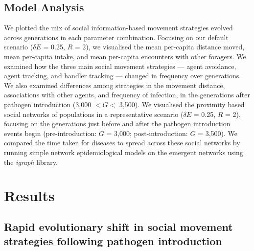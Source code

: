 \subsection*{Model Analysis}

We plotted the mix of social information-based movement strategies evolved across generations in each parameter combination.
Focusing on our default scenario ($\delta E$ = 0.25, $R$ = 2), we visualised the mean per-capita distance moved, mean per-capita intake, and mean per-capita encounters with other foragers.
We examined how the three main social movement strategies --- agent avoidance, agent tracking, and handler tracking --- changed in frequency over generations.
We also examined differences among strategies in the movement distance, associations with other agents, and frequency of infection, in the generations after pathogen introduction (3,000 $< G <$ 3,500).
We visualised the proximity based social networks of populations in a representative scenario ($\delta E$ = 0.25, $R$ = 2), focusing on the generations just before and after the pathogen introduction events begin (pre-introduction: $G$ = 3,000; post-introduction: $G$ = 3,500).
We compared the time taken for diseases to spread across these social networks by running simple network epidemiological models on the emergent networks \citep{bailey1975,white2017,stroeymeyt2018} using the \textit{igraph} \citep{csardi2006} library.

\section*{Results}

\subsection*{Rapid evolutionary shift in social movement strategies following pathogen introduction}

